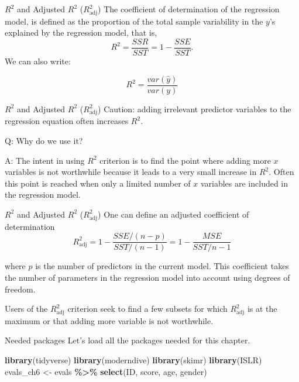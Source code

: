 \documentclass[
  ignorenonframetext,
]{beamer}
\newenvironment{Shaded}{\begin{snugshade}}{\end{snugshade}}
\newcommand{\FunctionTok}[1]{\textcolor[rgb]{0.13,0.29,0.53}{\textbf{#1}}}
\newcommand{\NormalTok}[1]{#1}
\newcommand{\OtherTok}[1]{\textcolor[rgb]{0.56,0.35,0.01}{#1}}
\newcommand{\SpecialCharTok}[1]{\textcolor[rgb]{0.81,0.36,0.00}{\textbf{#1}}}
\begin{document}
\begin{frame}{\(R^2\) and Adjusted \(R^2\) (\(R^2_{\text{adj}}\))}
\protect\hypertarget{r2-and-adjusted-r2-r2_textadj}{}
The coefficient of determination of the regression model, is defined as
the proportion of the total sample variability in the \(y\)'s explained
by the regression model, that is,
\[R^2=\frac{SSR}{SST}=1-\frac{SSE}{SST}.\] We can also write:

\[R^2=\frac{var(\hat{y})}{var(y)}\]
\end{frame}

\begin{frame}{\(R^2\) and Adjusted \(R^2\) (\(R^2_{\text{adj}}\))}
\protect\hypertarget{r2-and-adjusted-r2-r2_textadj-1}{}
Caution: adding irrelevant predictor variables to the regression
equation often increases \(R^2\).

Q: Why do we use it?

A: The intent in using \(R^2\) criterion is to find the point where
adding more \(x\) variables is not worthwhile because it leads to a very
small increase in \(R^2\). Often this point is reached when only a
limited number of \(x\) variables are included in the regression model.
\end{frame}

\begin{frame}{\(R^2\) and Adjusted \(R^2\) (\(R^2_{\text{adj}}\))}
\protect\hypertarget{r2-and-adjusted-r2-r2_textadj-2}{}
One can define an adjusted coefficient of determination
\[R^2_{\text{adj}}=1-\frac{SSE/(n-p)}{SST/ (n-1)}=1-\frac{MSE}{SST/n-1}\]

where \(p\) is the number of predictors in the current model. This
coefficient takes the number of parameters in the regression model into
account using degrees of freedom.

Users of the \(R^2_{\text{adj}}\) criterion seek to find a few subsets
for which \(R^2_{\text{adj}}\) is at the maximum or that adding more
variable is not worthwhile.
\end{frame}

\begin{frame}[fragile]{Needed packages}
\protect\hypertarget{needed-packages}{}
Let's load all the packages needed for this chapter.

\normalsize

\begin{Shaded}
\begin{Highlighting}[]
\FunctionTok{library}\NormalTok{(tidyverse) }
\FunctionTok{library}\NormalTok{(moderndive)}
\FunctionTok{library}\NormalTok{(skimr)}
\FunctionTok{library}\NormalTok{(ISLR)}
\NormalTok{evals\_ch6 }\OtherTok{\textless{}{-}}\NormalTok{ evals }\SpecialCharTok{\%\textgreater{}\%}
  \FunctionTok{select}\NormalTok{(ID, score, age, gender)}
\end{Highlighting}
\end{Shaded}

\normalsize
\end{frame}
\end{document}
